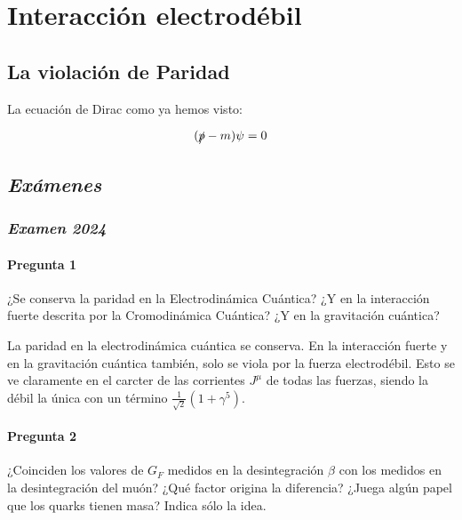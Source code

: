 \chapter{Interacción electrodébil}

\section{La violación de Paridad}

La ecuación de Dirac como ya hemos visto: 

\begin{equation}
    (\slashed{p} - m ) \psi = 0
\end{equation}

\lipsum[1]

\newpage
\section*{\textit{Exámenes}}

\subsection*{\textit{Examen 2024}}

\begin{Enunciado}

	\subsubsection*{Pregunta 1}

	¿Se conserva la paridad en la Electrodinámica Cuántica? ¿Y en la interacción fuerte descrita por la Cromodinámica Cuántica? ¿Y en la gravitación cuántica?

\end{Enunciado}

La paridad en la electrodinámica cuántica se conserva. En la interacción fuerte y en la gravitación cuántica también, solo se viola por la fuerza electrodébil. Esto se ve claramente en el carcter de las corrientes $J^\mu$ de todas las fuerzas, siendo la débil la única con un término $\frac{1}{\sqrt{2}}(1+\gamma^5)$.


\vspace*{2em}

\begin{Enunciado}
	\subsubsection*{Pregunta 2}

	¿Coinciden los valores de $G_F$ medidos en la desintegración $\beta$ con los medidos en la desintegración del muón? ¿Qué factor origina la diferencia? ¿Juega algún papel que los quarks tienen masa? Indica sólo la idea.

\end{Enunciado}

